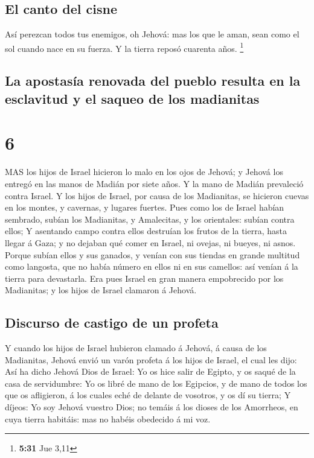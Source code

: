 \hypertarget{el-canto-del-cisne}{%
\subsection{El canto del cisne}\label{el-canto-del-cisne}}

 Así perezcan todos tus enemigos, oh Jehová: mas los que le
aman, sean como el sol cuando nace en su fuerza. Y la tierra reposó
cuarenta años. \footnote{\textbf{5:31} Jue 3,11}

\hypertarget{la-apostasuxeda-renovada-del-pueblo-resulta-en-la-esclavitud-y-el-saqueo-de-los-madianitas}{%
\subsection{La apostasía renovada del pueblo resulta en la esclavitud y
el saqueo de los
madianitas}\label{la-apostasuxeda-renovada-del-pueblo-resulta-en-la-esclavitud-y-el-saqueo-de-los-madianitas}}

\hypertarget{section-5}{%
\section{6}\label{section-5}}

 MAS los hijos de Israel hicieron lo malo en los ojos de
Jehová; y Jehová los entregó en las manos de Madián por siete años.
 Y la mano de Madián prevaleció contra Israel. Y los hijos
de Israel, por causa de los Madianitas, se hicieron cuevas en los
montes, y cavernas, y lugares fuertes.  Pues como los de
Israel habían sembrado, subían los Madianitas, y Amalecitas, y los
orientales: subían contra ellos;  Y asentando campo contra
ellos destruían los frutos de la tierra, hasta llegar á Gaza; y no
dejaban qué comer en Israel, ni ovejas, ni bueyes, ni asnos.
 Porque subían ellos y sus ganados, y venían con sus tiendas
en grande multitud como langosta, que no había número en ellos ni en sus
camellos: así venían á la tierra para devastarla.  Era pues
Israel en gran manera empobrecido por los Madianitas; y los hijos de
Israel clamaron á Jehová.

\hypertarget{discurso-de-castigo-de-un-profeta}{%
\subsection{Discurso de castigo de un
profeta}\label{discurso-de-castigo-de-un-profeta}}

 Y cuando los hijos de Israel hubieron clamado á Jehová, á
causa de los Madianitas,  Jehová envió un varón profeta á
los hijos de Israel, el cual les dijo: Así ha dicho Jehová Dios de
Israel: Yo os hice salir de Egipto, y os saqué de la casa de
servidumbre:  Yo os libré de mano de los Egipcios, y de mano
de todos los que os afligieron, á los cuales eché de delante de
vosotros, y os dí su tierra;  Y díjeos: Yo soy Jehová
vuestro Dios; no temáis á los dioses de los Amorrheos, en cuya tierra
habitáis: mas no habéis obedecido á mi voz.


